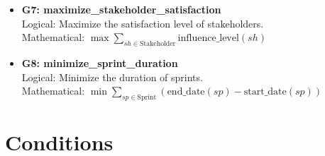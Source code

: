 \documentclass[11pt]{article}
\begin{document}
\begin{itemize}
    \item \textbf{G7: maximize\_stakeholder\_satisfaction} \\
    Logical: Maximize the satisfaction level of stakeholders. \\
    Mathematical: $\max \sum_{sh \in \text{Stakeholder}} \text{influence\_level}(sh)$
    
    \item \textbf{G8: minimize\_sprint\_duration} \\
    Logical: Minimize the duration of sprints. \\
    Mathematical: $\min \sum_{sp \in \text{Sprint}} (\text{end\_date}(sp) - \text{start\_date}(sp))$
\end{itemize}

\section{Conditions}
\end{document}
